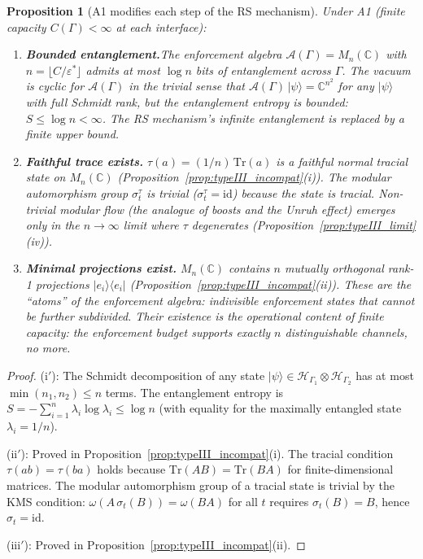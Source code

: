 \documentclass[11pt,a4paper]{article}
\newtheorem{proposition}[theorem]{Proposition}
\theoremstyle{definition}
\newcommand{\eps}{\varepsilon}
\begin{document}
\begin{proposition}[A1 modifies each step of the RS mechanism]%
\label{prop:RS_modification}
Under A1 (finite capacity $C(\Gamma) < \infty$ at each interface):
\begin{enumerate}[label=(\roman*${}'$),nosep]
  \item \textbf{Bounded entanglement.}\quad The enforcement algebra
  $\mathcal{A}(\Gamma) = M_n(\mathbb{C})$ with
  $n = \lfloor C / \eps^* \rfloor$ admits at most $\log n$ bits of
  entanglement across $\Gamma$.  The vacuum is cyclic for
  $\mathcal{A}(\Gamma)$ in the trivial sense that
  $\mathcal{A}(\Gamma)\,|\psi\rangle = \mathbb{C}^{n^2}$ for any
  $|\psi\rangle$ with full Schmidt rank, but the entanglement entropy
  is bounded: $S \le \log n < \infty$.  The RS mechanism's infinite
  entanglement is replaced by a finite upper bound.
  \item \textbf{Faithful trace exists.}\quad
  $\tau(a) = (1/n)\,\mathrm{Tr}(a)$ is a faithful normal tracial state
  on $M_n(\mathbb{C})$
  (Proposition~\ref{prop:typeIII_incompat}(i)).  The modular
  automorphism group $\sigma_t^\tau$ is trivial ($\sigma_t^\tau =
  \mathrm{id}$) because the state is tracial.  Non-trivial modular
  flow (the analogue of boosts and the Unruh effect) emerges only in
  the $n \to \infty$ limit where $\tau$ degenerates
  (Proposition~\ref{prop:typeIII_limit}(iv)).
  \item \textbf{Minimal projections exist.}\quad
  $M_n(\mathbb{C})$ contains $n$ mutually orthogonal rank-1
  projections $|e_i\rangle\langle e_i|$
  (Proposition~\ref{prop:typeIII_incompat}(ii)).  These are the
  ``atoms'' of the enforcement algebra: indivisible enforcement states
  that cannot be further subdivided.  Their existence is the
  operational content of finite capacity: the enforcement budget
  supports exactly $n$ distinguishable channels, no more.
\end{enumerate}
\end{proposition}

\begin{proof}
(i${}'$): The Schmidt decomposition of any state
$|\psi\rangle \in \mathcal{H}_{\Gamma_1} \otimes
\mathcal{H}_{\Gamma_2}$ has at most $\min(n_1, n_2) \le n$ terms.
The entanglement entropy is $S = -\sum_{i=1}^n \lambda_i \log
\lambda_i \le \log n$ (with equality for the maximally entangled
state $\lambda_i = 1/n$).

(ii${}'$): Proved in
Proposition~\ref{prop:typeIII_incompat}(i).  The tracial condition
$\tau(ab) = \tau(ba)$ holds because
$\mathrm{Tr}(AB) = \mathrm{Tr}(BA)$ for finite-dimensional matrices.
The modular automorphism group of a tracial state is trivial by the
KMS condition: $\omega(A\,\sigma_t(B)) = \omega(BA)$ for all $t$
requires $\sigma_t(B) = B$, hence $\sigma_t = \mathrm{id}$.

(iii${}'$): Proved in
Proposition~\ref{prop:typeIII_incompat}(ii).
\end{proof}
\end{document}
